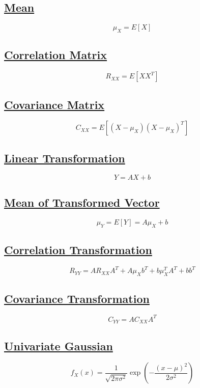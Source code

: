 \documentclass[11pt]{article}
\begin{document}
\subsection*{\underline{Mean}}
\[
\mu_X = E[X]
\]

\vspace{0.5cm}
\subsection*{\underline{Correlation Matrix}}
\[
R_{XX} = E[XX^T]
\]

\vspace{0.5cm}
\subsection*{\underline{Covariance Matrix}}
\[
C_{XX} = E[(X - \mu_X)(X - \mu_X)^T]
\]

\vspace{0.5cm}
\subsection*{\underline{Linear Transformation}}
\[
Y = AX + b
\]

\vspace{0.5cm}
\subsection*{\underline{Mean of Transformed Vector}}
\[
\mu_Y = E[Y] = A\mu_X + b
\]

\vspace{0.5cm}
\subsection*{\underline{Correlation Transformation}}
\[
R_{YY} = AR_{XX}A^T + A\mu_X b^T + b\mu_X^T A^T + bb^T
\]

\vspace{0.5cm}
\subsection*{\underline{Covariance Transformation}}
\[
C_{YY} = AC_{XX}A^T
\]

\vspace{0.5cm}
\subsection*{\underline{Univariate Gaussian}}
\[
f_X(x) = \frac{1}{\sqrt{2\pi\sigma^2}} \exp\left(-\frac{(x-\mu)^2}{2\sigma^2}\right)
\]
\end{document}
